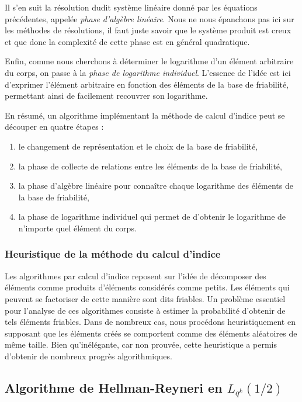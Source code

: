\documentclass[a4paper, titlepage, 11pt]{article}
\theoremstyle{definition}
\theoremstyle{remark}
\begin{document}
Il s'en suit la résolution dudit système linéaire donné par les équations précédentes, appelée \textit{phase d'algèbre linéaire}. Nous ne nous épanchons pas ici sur les méthodes de résolutions, il faut juste savoir que le système produit est creux et que donc la complexité de cette phase est en général quadratique.

Enfin, comme nous cherchons à déterminer le logarithme d'un élément arbitraire du corps, on passe à la \textit{phase de logarithme individuel}. L'essence de l'idée est ici d'exprimer l'élément arbitraire en fonction des éléments de la base de friabilité, permettant ainsi de facilement recouvrer son logarithme.

En résumé, un algorithme implémentant la méthode de calcul d'indice peut se découper en quatre étapes : \begin{enumerate}
\item le changement de représentation et le choix de la base de friabilité,
\item la phase de collecte de relations entre les éléments de la base de friabilité,
\item la phase d'algèbre linéaire pour connaître chaque logarithme des éléments de la base de friabilité,
\item la phase de logarithme individuel qui permet de d'obtenir le logarithme de n’importe quel élément du corps.
\end{enumerate}

\subsubsection{Heuristique de la méthode du calcul d'indice}
Les algorithmes par calcul d'indice reposent sur l'idée de décomposer des éléments comme produits d'éléments considérés comme petits. Les éléments qui peuvent se factoriser de cette manière sont dits friables. Un problème essentiel pour l'analyse de ces algorithmes consiste à estimer la probabilité d'obtenir de tels éléments friables. Dans de nombreux cas, nous procédons heuristiquement en supposant que les éléments créés se comportent comme des éléments aléatoires de même taille. Bien qu'inélégante, car non prouvée, cette heuristique a permis d'obtenir de nombreux progrès algorithmiques.

\subsection{Algorithme de Hellman-Reyneri en $L_{q^k}(1/2)$}
\end{document}
